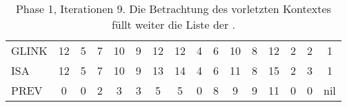 \begin{table}[H]
\begin{adjustbox}{max width=\textwidth}
\begin{tabular}{lccccccccccccccc}
\multicolumn{1}{l|}{GLINK}   & 12                      & 5                         & 7                         & 10                         & 9                           & 12                        & 12                         & 4                       & 6                        & 10 & 8                       & 12 & 2                         & 2                         & 1   \\
\multicolumn{1}{l|}{ISA}     & 12                      & 5                         & 7                         & 10                         & 9                           & 13                        & 14                         & 4                       & 6                        & 11 & 8                       & 15 & 2                         & 3                         & 1   \\
\multicolumn{1}{l|}{PREV}    & 0                       & 0                         & 2                         & 3                          & 3                           & 5                         & 5                          & 0                       & 8                        & 9  & 9                       & 11 & \cellcolor[HTML]{\red}0 & \cellcolor[HTML]{\red}0 & nil
\end{tabular}
\end{adjustbox}

\caption[Phase 1, Iterationen 9]{Phase 1, Iterationen 9. Die Betrachtung des vorletzten Kontextes füllt weiter die Liste der \prevpointer.}
\label{table_complex_example_1_9} 
\end{table}

